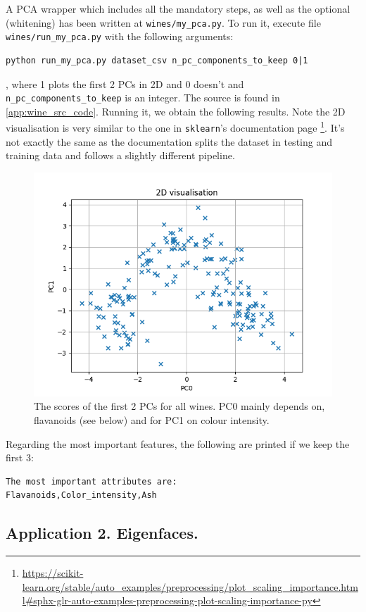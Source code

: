 \documentclass[a4paper]{article}
\begin{document}
A PCA wrapper which includes all the mandatory steps, as well as the optional (whitening) has been written at \texttt{wines/my\_pca.py}. To run it, execute file \texttt{wines/run\_my\_pca.py} with the following arguments:
\begin{verbatim}
python run_my_pca.py dataset_csv n_pc_components_to_keep 0|1
\end{verbatim}
, where 1 plots the first 2 PCs in 2D and 0 doesn't and \texttt{n\_pc\_components\_to\_keep} is an integer. The source is found in \ref{app:wine_src_code}. Running it, we obtain the following results. Note the 2D visualisation is very similar to the one in \texttt{sklearn}'s documentation page \footnote{\url{https://scikit-learn.org/stable/auto_examples/preprocessing/plot_scaling_importance.html\#sphx-glr-auto-examples-preprocessing-plot-scaling-importance-py}}. It's not exactly the same as the documentation splits the dataset in testing and training data and follows a slightly different pipeline.
\begin{figure}[H]
    \centering
    \captionsetup{width=.45\linewidth}
    \includegraphics[width=.4\linewidth]{img/wine_result_2d.png}
    \caption{The scores of the first 2 PCs for all wines. PC0 mainly depends on, flavanoids (see below) and for PC1 on colour intensity.}
\end{figure}
Regarding the most important features, the following are printed if we keep the first 3:
\begin{verbatim}
The most important attributes are:
Flavanoids,Color_intensity,Ash
\end{verbatim}


\subsection{Application 2. Eigenfaces.}
\end{document}
